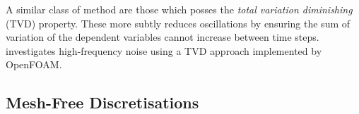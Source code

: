 A similar class of method are those which posses the \emph{total variation diminishing} (TVD) property. These more subtly reduces oscillations by ensuring the sum of variation of the dependent variables cannot increase between time steps. \cite{eigemann2025AmplificationThermoacousticFlame} investigates high-frequency noise using a TVD approach implemented by OpenFOAM.



\subsection{Mesh-Free Discretisations}





